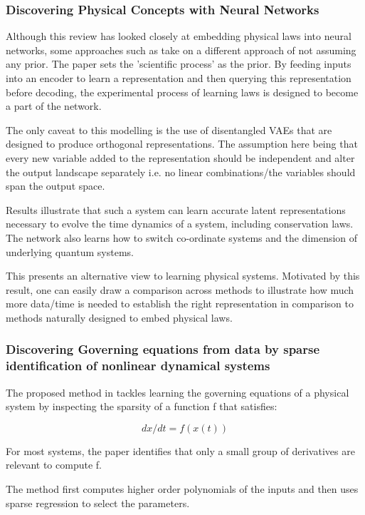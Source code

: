 \documentclass{article}
\begin{document}
\subsubsection{Discovering Physical Concepts with Neural Networks}

Although this review has looked closely at embedding physical laws into neural networks, some approaches such as \cite{iten_discovering_2020} take on a different approach of not assuming any prior. The paper sets the 'scientific process' as the prior. 
By feeding inputs into an encoder to learn a representation and then querying this representation before decoding, the experimental process of learning laws is designed to become a part of the network.

The only caveat to this modelling is the use of disentangled VAEs that are designed to produce orthogonal representations. The assumption here being that every new variable added to the representation should be independent and alter the output landscape separately i.e. no linear combinations/the variables should span the output space.

Results illustrate that such a system can learn accurate latent representations necessary to evolve the time dynamics of a system, including conservation laws. The network also learns how to switch co-ordinate systems and the dimension of underlying quantum systems. 

This presents an alternative view to learning physical systems. Motivated by this result, one can easily draw a comparison across methods to illustrate how much more data/time is needed to establish the right representation in comparison to methods naturally designed to embed physical laws. 

\subsubsection{Discovering Governing equations from data by sparse identification of nonlinear dynamical systems}

 The proposed method in \cite{brunton_discovering_2016} tackles learning the governing equations of a physical system by inspecting the sparsity of a function f that satisfies:
 
 $$ d x/dt = f(x(t)) $$
 
 For most systems, the paper identifies that only a small group of derivatives are relevant to compute f. 
 
 The method first computes higher order polynomials of the inputs and then uses sparse regression to select the parameters. 
 
\end{document}
